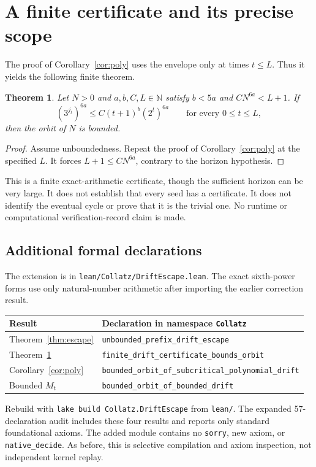 \documentclass[11pt]{article}
\newtheorem{theorem}{Theorem}
\begin{document}
\newpage
\section{A finite certificate and its precise scope}\label{sec:certificate}
The proof of Corollary~\ref{cor:poly} uses the envelope only at times $t\le L$. Thus it yields the following finite theorem.
\begin{theorem}\label{thm:finitecert}
Let $N>0$ and $a,b,C,L\in\mathbb N$ satisfy $b<5a$ and $C N^{6a}<L+1$. If
\[
(3^{j_t})^{6a}\le C(t+1)^b(2^t)^{6a}
\qquad\text{for every }0\le t\le L,
\]
then the orbit of $N$ is bounded.
\end{theorem}
\begin{proof}
Assume unboundedness. Repeat the proof of Corollary~\ref{cor:poly} at the specified $L$. It forces $L+1\le C N^{6a}$, contrary to the horizon hypothesis.
\end{proof}
This is a finite exact-arithmetic certificate, though the sufficient horizon can be very large. It does not establish that every seed has a certificate. It does not identify the eventual cycle or prove that it is the trivial one. No runtime or computational verification-record claim is made.

\subsection*{Additional formal declarations}
The extension is in \texttt{lean/Collatz/DriftEscape.lean}. The exact sixth-power forms use only natural-number arithmetic after importing the earlier correction result.
\begin{center}\small
\begin{tabular}{lp{9.6cm}}
\toprule
Result&Declaration in namespace \texttt{Collatz}\\
\midrule
Theorem~\ref{thm:escape}&\texttt{unbounded\_prefix\_drift\_escape}\\
Theorem~\ref{thm:finitecert}&\texttt{finite\_drift\_certificate\_bounds\_orbit}\\
Corollary~\ref{cor:poly}&\texttt{bounded\_orbit\_of\_subcritical\_polynomial\_drift}\\
Bounded $M_t$&\texttt{bounded\_orbit\_of\_bounded\_drift}\\
\bottomrule
\end{tabular}\end{center}
Rebuild with \texttt{lake build Collatz.DriftEscape} from \texttt{lean/}. The expanded 57-declaration audit includes these four results and reports only standard foundational axioms. The added module contains no \texttt{sorry}, new axiom, or \texttt{native\_decide}. As before, this is selective compilation and axiom inspection, not independent kernel replay.
\end{document}

